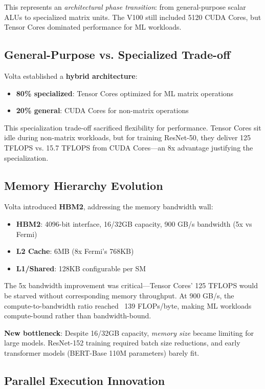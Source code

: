 \documentclass{article}
\begin{document}
This represents an \textit{architectural phase transition}: from general-purpose scalar ALUs to specialized matrix units. The V100 still included 5120 CUDA Cores, but Tensor Cores dominated performance for ML workloads.

\subsection{General-Purpose vs. Specialized Trade-off}

Volta established a \textbf{hybrid architecture}:
\begin{itemize}
\item \textbf{80\% specialized}: Tensor Cores optimized for ML matrix operations
\item \textbf{20\% general}: CUDA Cores for non-matrix operations
\end{itemize}

This specialization trade-off sacrificed flexibility for performance. Tensor Cores sit idle during non-matrix workloads, but for training ResNet-50, they deliver 125 TFLOPS vs. 15.7 TFLOPS from CUDA Cores—an 8x advantage justifying the specialization.

\subsection{Memory Hierarchy Evolution}

Volta introduced \textbf{HBM2}, addressing the memory bandwidth wall:
\begin{itemize}
\item \textbf{HBM2}: 4096-bit interface, 16/32GB capacity, 900 GB/s bandwidth (5x vs Fermi)
\item \textbf{L2 Cache}: 6MB (8x Fermi's 768KB)
\item \textbf{L1/Shared}: 128KB configurable per SM
\end{itemize}

The 5x bandwidth improvement was critical—Tensor Cores' 125 TFLOPS would be starved without corresponding memory throughput. At 900 GB/s, the compute-to-bandwidth ratio reached ~139 FLOPs/byte, making ML workloads compute-bound rather than bandwidth-bound.

\textbf{New bottleneck}: Despite 16/32GB capacity, \textit{memory size} became limiting for large models. ResNet-152 training required batch size reductions, and early transformer models (BERT-Base 110M parameters) barely fit.

\subsection{Parallel Execution Innovation}
\end{document}
